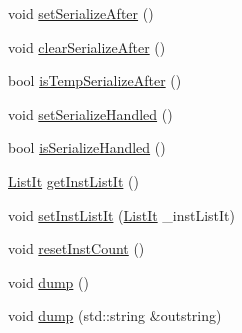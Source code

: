 \begin{DoxyCompactItemize}
\item 
void \hyperlink{classInOrderDynInst_a3e4776abfedcc80df8c826a7f3c3efd3}{setSerializeAfter} ()
\item 
void \hyperlink{classInOrderDynInst_abe42baa87e7660df60248deec78f8d5a}{clearSerializeAfter} ()
\item 
bool \hyperlink{classInOrderDynInst_a8d1ad9904dbbde344554070bfaaab86f}{isTempSerializeAfter} ()
\item 
void \hyperlink{classInOrderDynInst_ad115419b3ec6552a9db93ba349c73285}{setSerializeHandled} ()
\item 
bool \hyperlink{classInOrderDynInst_a33db384950219c3c71206fbb2c7d8025}{isSerializeHandled} ()
\item 
\hyperlink{classInOrderDynInst_a184cb829e22cc656acb41864f68f51ea}{ListIt} \hyperlink{classInOrderDynInst_a290695d2703aea910b20df936dab8ce4}{getInstListIt} ()
\item 
void \hyperlink{classInOrderDynInst_aeb6ae2640509c7f45f53c03d92f8f920}{setInstListIt} (\hyperlink{classInOrderDynInst_a184cb829e22cc656acb41864f68f51ea}{ListIt} \_\-instListIt)
\item 
void \hyperlink{classInOrderDynInst_a01acb977c624a165628ca1543bf9b4db}{resetInstCount} ()
\item 
void \hyperlink{classInOrderDynInst_accd2600060dbaee3a3b41aed4034c63c}{dump} ()
\item 
void \hyperlink{classInOrderDynInst_a5d337b0f151368459d1a95a6470f18ca}{dump} (std::string \&outstring)
\end{DoxyCompactItemize}
